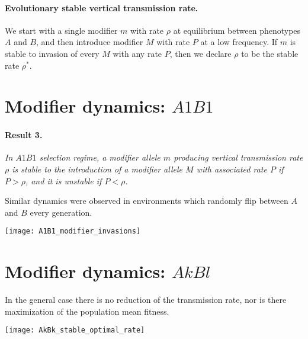 \documentclass[a0,landscape]{a0poster}
\begin{document}
\begin{multicols}{4}
\paragraph{Evolutionary stable vertical transmission rate.}
We start with a single modifier $m$ with rate $\rho$ at equilibrium between phenotypes $A$ and $B$, and then introduce modifier $M$ with rate $P$ at a low frequency.
If $m$ is stable to invasion of every $M$ with any rate $P$, then we declare $\rho$ to be the stable rate $\rho^*$.

\columnbreak

\section*{Modifier dynamics: $A1B1$}

\paragraph*{Result 3.}\textit{In $A1B1$ selection regime, a modifier allele $m$ producing vertical transmission rate $\rho$ is stable to the introduction of a modifier allele $M$ with associated rate $P$ if $P>\rho$, and it is unstable if $P<\rho$.
}

Similar dynamics were observed in environments which randomly flip between $A$ and $B$ every generation.


\begin{center}\vspace{1cm}
\texttt{[image: A1B1\_modifier\_invasions]}
\end{center}\vspace{1cm}

\columnbreak

\section*{Modifier dynamics: $AkBl$}

In the general case there is no reduction of the transmission rate, nor is there maximization of the population mean fitness.

\begin{center}\vspace{1cm}
\texttt{[image: AkBk\_stable\_optimal\_rate]}
\end{center}\vspace{1cm}


\end{multicols}
\end{document}
